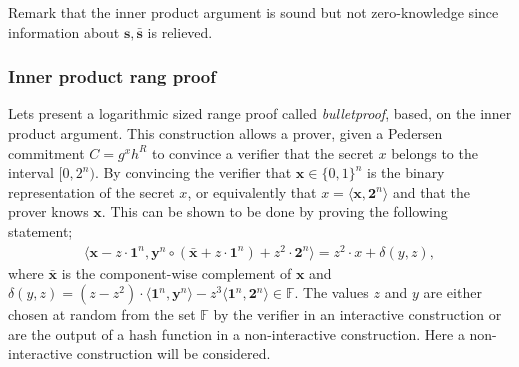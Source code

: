  
Remark that the inner product argument is sound but not zero-knowledge since information about $\bm{s},\bm{\bar{s}}$ is relieved.

\subsubsection*{Inner product rang proof}
Lets present a logarithmic sized range proof called \textit{bulletproof}, based, on the inner product argument. This construction allows a prover, given a Pedersen commitment $C=g^x h^R$ to convince a verifier that the secret $x$ belongs to the interval $[0,2^n)$. By convincing the verifier that  $\bm{x}\in\{0,1\}^n$ is the binary representation of the secret $x$, or equivalently that $x= \langle \bm{x},\mathbf{2}^n\rangle $ and that the prover knows $\bm{x}$.
This can be shown to be done by proving the following statement;
\begin{align}
    \big\langle \bm{x} -z\cdot \bm{1}^n, \bm{y}^n\circ (\bm{\bar{x}} + z \cdot\bm{1}^n) + z^2\cdot\bm{2}^n \big\rangle = z^2\cdot x+ \delta(y,z),
    \label{eq:range_non_zero}
\end{align}
where $\bar{\bm{x}}$ is the component-wise complement of $\bm{x}$ and $\delta(y,z) = (z-z^2)\cdot\langle\bm{1}^n,\bm{y}^n\rangle-z^3\langle \bm{1}^n,\bm{2}^n\rangle\in\mathds{F}$.
The values $z$ and $y$ are either chosen at random from the set $\mathds{F}$ by the verifier in an interactive construction or are the output of a hash function in a non-interactive construction. Here a non-interactive construction will be considered. 


